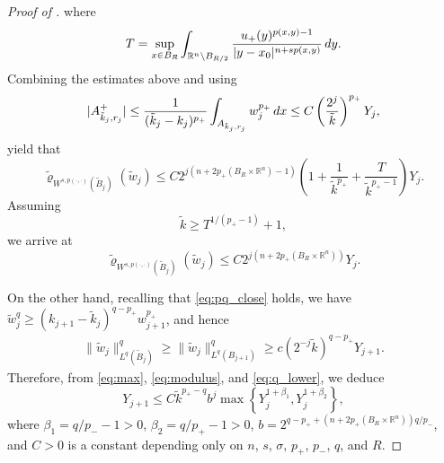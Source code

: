 \documentclass[11pt]{amsart}
\theoremstyle{plain}
\theoremstyle{definition}
\numberwithin{equation}{section}
\renewcommand{\d}{\textnormal{d}}
\newcommand{\R}{\mathbb{R}}
\begin{document}
\begin{proof} [Proof of ]
where
\begin{equation*}
T = \sup_{x \in B_{R}} \int_{\R^n \setminus B_{R/2}} \frac{u_+(y)^{p(x,y)-1}}{|y-x_0|^{n+sp(x,y)}} \, \d y.
\end{equation*}
Combining the estimates above and using
\begin{equation*}
|A_{\tilde{k}_j, r_j}^+| \leq \frac{1}{(\tilde{k}_j - k_j)^{p_+}} \int_{A_{\tilde{k}_j, r_j}} w_j^{p_+} \,\d x \leq C \left( \frac{2^{j}}{\tilde{k}} \right)^{p_+} Y_j,
\end{equation*}
yield that
\begin{equation*}
\tilde{\varrho}_{W^{s, p(\cdot,\cdot)}(\tilde{B}_j)}(\tilde{w}_j) \leq C 2^{j(n+2p_+(B_R \times \mathbb{R}^n)-1)} \left( 1+ \frac{1}{\tilde{k}^{p_+}} + \frac{T}{\tilde{k}^{p_+-1}} \right) Y_j.
\end{equation*}
Assuming
\begin{equation} \label{eq:tilde_k}
\tilde{k} \geq T^{1/(p_+-1)} + 1,
\end{equation}
we arrive at
\begin{equation} \label{eq:modulus}
\tilde{\varrho}_{W^{s, p(\cdot,\cdot)}(\tilde{B}_j)}(\tilde{w}_j) \leq C 2^{j(n+2p_+(B_R \times \mathbb{R}^n))} Y_j.
\end{equation}

On the other hand, recalling that \eqref{eq:pq_close} holds, we have $\tilde{w}_j^{q} \geq (k_{j+1}-\tilde{k}_j)^{q-p_+} w_{j+1}^{p_+}$, and hence
\begin{equation} \label{eq:q_lower}
\begin{split}
\|\tilde{w}_j\|_{L^{q}(\tilde{B}_j)}^{q} \geq \|\tilde{w}_j\|_{L^{q}(B_{j+1})}^{q} \geq c(2^{-j}\tilde{k})^{q-p_+} Y_{j+1}.
\end{split}
\end{equation}
Therefore, from \eqref{eq:max}, \eqref{eq:modulus}, and \eqref{eq:q_lower}, we deduce 
\begin{equation*}
Y_{j+1} \leq C \tilde{k}^{p_+-q} b^j \max \left\lbrace Y_j^{1+\beta_1}, Y_j^{1+\beta_2} \right\rbrace,
\end{equation*}
where $\beta_1 = q/p_- -1 > 0$, $\beta_2 = q/p_+ - 1 > 0$, $b = 2^{q-p_+ + (n+2p_+(B_R \times \mathbb{R}^n))q/p_-}$, and $C > 0$ is a constant depending only on $n$, $s$, $\sigma$, $p_+$, $p_-$, $q$, and $R$. 


\end{proof}
\end{document}

